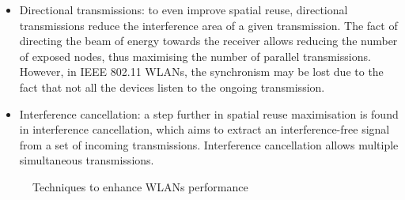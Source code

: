 \documentclass[12pt, a4paper,twoside]{tesi_upf}
\begin{document}
\begin{itemize}
				\item Directional transmissions: to even improve spatial reuse, directional transmissions reduce the interference area of a given transmission. The fact of directing the beam of energy towards the receiver allows reducing the number of exposed nodes, thus maximising the number of parallel transmissions. However, in IEEE 802.11 WLANs, the synchronism may be lost due to the fact that not all the devices listen to the ongoing transmission. 
				\item Interference cancellation: a step further in spatial reuse maximisation is found in interference cancellation, which aims to extract an interference-free signal from a set of incoming transmissions. Interference cancellation allows multiple simultaneous transmissions.
			\end{itemize}
			\begin{figure}[h!]
				\centering
				\caption{Techniques to enhance WLANs performance}
				\label{fig:techniques_wns}
			\end{figure}	
		
\end{document}
